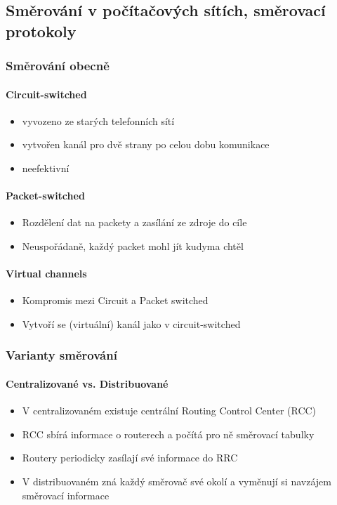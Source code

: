 \documentclass[10pt,a4paper]{article}
\begin{document}
\subsection{Směrování v počítačových sítích, směrovací protokoly}
\subsubsection{Směrování obecně}
\paragraph{Circuit-switched}
\begin{itemize}
\item vyvozeno ze starých telefonních sítí
\item vytvořen kanál pro dvě strany po celou dobu komunikace
\item neefektivní
\end{itemize}
\paragraph{Packet-switched}
\begin{itemize}
\item Rozdělení dat na packety a zasílání ze zdroje do cíle
\item Neuspořádaně, každý packet mohl jít kudyma chtěl
\end{itemize}
\paragraph{Virtual channels}
\begin{itemize}
\item Kompromis mezi Circuit a Packet switched
\item Vytvoří se (virtuální) kanál jako v circuit-switched
\end{itemize}
\subsubsection{Varianty směrování}
\paragraph{Centralizované vs. Distribuované}
\begin{itemize}
\item V centralizovaném existuje centrální Routing Control Center (RCC)
\item RCC sbírá informace o routerech a počítá pro ně směrovací tabulky
\item Routery periodicky zasílají své informace do RRC
\item V distribuovaném zná každý směrovač své okolí a vyměnují si navzájem směrovací informace
\end{itemize}
\end{document}
